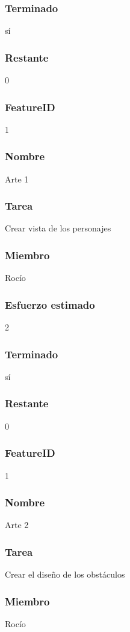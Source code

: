 \subsubsection{Terminado} sí
\subsubsection{Restante} 0


\subsubsection{FeatureID} 1
\subsubsection{Nombre} Arte 1
\subsubsection{Tarea} Crear vista de los personajes
\subsubsection{Miembro} Rocío
\subsubsection{Esfuerzo estimado} 2
\subsubsection{Terminado} sí
\subsubsection{Restante} 0



\subsubsection{FeatureID} 1
\subsubsection{Nombre} Arte 2
\subsubsection{Tarea} Crear el diseño de los obstáculos
\subsubsection{Miembro} Rocío
